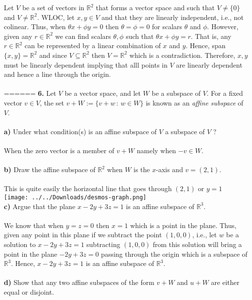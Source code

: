 \documentclass[11pt]{amsart}
\theoremstyle{definition}  %
\newcommand{\R}{\mathbb{R}}
\begin{document}
Let $V$ be a set of vectors in $\R^2$ that forms a vector space and such that $V \ne \{0\}$ and $V\ne \R^2$.  WLOC, let $x, y \in V$ and that they are linearly independent, i.e., not colinear.   Thus, when $\theta x + \phi y = 0$ then $\theta = \phi = 0$ for scalars $\theta$ and $\phi$.  However, given any $r \in \R^2$ we can find scalars $\theta, \phi$ such that $\theta x + \phi y = r$.  That is, any $r \in \R^2$ can be represented by a linear combination of $x$ and $y$. Hence, span$ \{x,y\} = \R^2$ and since $V \subseteq \R^2$ then $V = \R^2$ which is a contradiction.  Therefore, $x,y$ must be linearly dependent implying that alll points in $V$ are linearly dependent and hence a line through the origin.\\
\\
======
\newpage
\vskip 0.1cm
\noindent
{\bf 6.} Let $V$ be a vector space, and let $W$ be a subspace of $V$. For a fixed vector $v \in V$, the set $v + W := \{v + w \, : \, w \in W\}$
is known as an {\it affine subspace} of $V$. \\
\\
{\bf a)} Under what condition(s) is an affine subspace of $V$ a subspace of $V$ ? \\
\\
When the zero vector is a member of $v+W$ namely when $-v \in W$.
\\
\\
{\bf b)} Draw the affine subspace of $\R^2$ when $W$ is the $x$-axis and $v = (2,1)$. \\
\\
This is quite easily the horizontal line that goes through $(2,1)$ or $y=1$\\\texttt{[image: ../../Downloads/desmos-graph.png]} 
\\
{\bf c)} Argue that  the plane $x - 2y + 3z = 1$ is an affine subspace of $\R^3$. \\
\\
We know that when $y=z=0$ then $x=1$ which is a point in the plane.  Thus, given any point in this plane if we subtract the point $(1,0,0)$, i.e., let $w$ be a solution to $x-2y+3z=1$ subtracting $(1,0,0)$ from this solution will bring a point in the plane $-2y+3z=0$ passing through the origin which is a subspace of $\R^3$.  Hence, $x-2y+3z=1$ is an affine subspace of $\R^3$. \\
\\
{\bf d)} Show that any two affine subspaces of the form $v + W$ and $u + W$ are either equal or disjoint. \\
\end{document}
